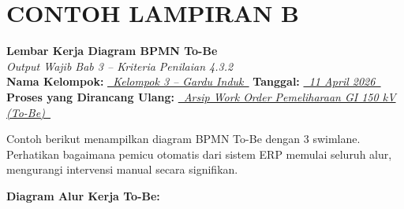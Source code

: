 \documentclass[12pt,a4paper]{report}
\begin{document}
\newpage
\section*{\color{plnblue} CONTOH LAMPIRAN B}
{\Large\bfseries Lembar Kerja Diagram BPMN To-Be}\\[0.15cm]
{\normalsize\color{medgray}\textit{Output Wajib Bab 3 -- Kriteria Penilaian 4.3.2}}\\[0.4cm]

\noindent\textbf{Nama Kelompok:} \underline{\textit{~Kelompok 3 -- Gardu Induk~}} \quad \textbf{Tanggal:} \underline{\textit{~11 April 2026~}}\\[0.25cm]
\textbf{Proses yang Dirancang Ulang:} \underline{\textit{~Arsip Work Order Pemeliharaan GI 150 kV (To-Be)~}}

\vspace{0.3cm}

\begin{contohbox}
Contoh berikut menampilkan diagram BPMN To-Be dengan 3 swimlane. Perhatikan bagaimana pemicu otomatis dari sistem ERP memulai seluruh alur, mengurangi intervensi manual secara signifikan.
\end{contohbox}

\vspace{0.3cm}

\noindent\textbf{Diagram Alur Kerja To-Be:}
\end{document}
